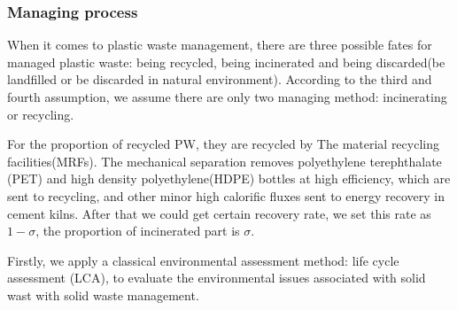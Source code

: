 \documentclass{mcmthesis}
\begin{document}
\subsubsection{Managing process}

When it comes to plastic waste management, there are three possible fates for managed plastic waste: being recycled, being incinerated and being discarded(be landfilled or be discarded in natural environment). According to the third and fourth assumption, we assume there are only two managing method: incinerating or recycling.


For the proportion of recycled PW, they are recycled by The material recycling facilities(MRFs). The mechanical separation removes polyethylene terephthalate (PET) and high density polyethylene(HDPE) bottles at high efficiency, which are sent to recycling, and other minor high calorific fluxes sent to energy recovery in cement kilns\cite{Rigamonti}. After that we could get certain recovery rate, we set this rate as $1 - \sigma$, the proportion of incinerated part is $\sigma$.

Firstly, we apply a classical environmental assessment method: life cycle assessment (LCA), to evaluate the environmental issues associated with solid wast with solid waste management\cite{Kirkeby}.

\end{document}

